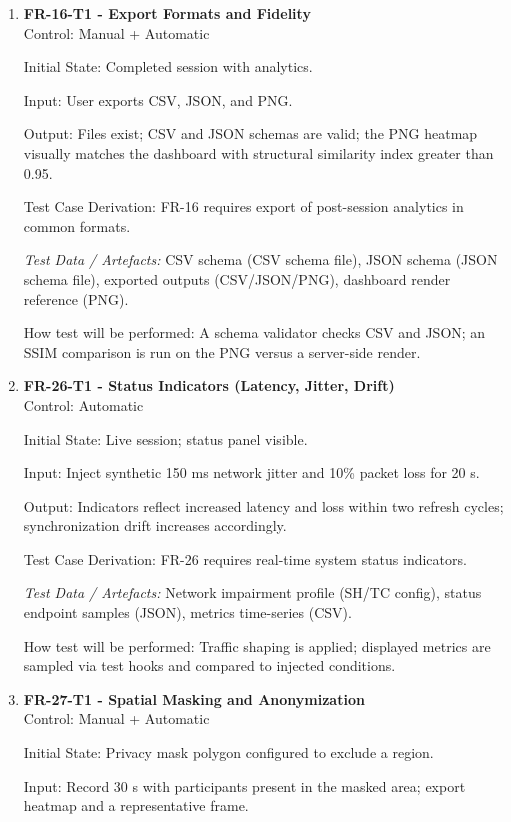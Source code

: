 \documentclass[12pt, titlepage]{article}
\begin{document}
\begin{enumerate}
\item \textbf{FR-16-T1 - Export Formats and Fidelity} \\

Control: Manual + Automatic

Initial State: Completed session with analytics.

Input: User exports CSV, JSON, and PNG.

Output: Files exist; CSV and JSON schemas are valid; the PNG heatmap visually matches the dashboard with structural similarity index greater than 0.95.

Test Case Derivation: FR-16 requires export of post-session analytics in common formats.

\textit{Test Data / Artefacts:} CSV schema (CSV schema file), JSON schema (JSON schema file), exported outputs (CSV/JSON/PNG), dashboard render reference (PNG).

How test will be performed: A schema validator checks CSV and JSON; an SSIM comparison is run on the PNG versus a server-side render.

\item \textbf{FR-26-T1 - Status Indicators (Latency, Jitter, Drift)} \\

Control: Automatic

Initial State: Live session; status panel visible.

Input: Inject synthetic 150 ms network jitter and 10\% packet loss for 20 s.

Output: Indicators reflect increased latency and loss within two refresh cycles; synchronization drift increases accordingly.

Test Case Derivation: FR-26 requires real-time system status indicators.

\textit{Test Data / Artefacts:} Network impairment profile (SH/TC config), status endpoint samples (JSON), metrics time-series (CSV).

How test will be performed: Traffic shaping is applied; displayed metrics are sampled via test hooks and compared to injected conditions.

\item \textbf{FR-27-T1 - Spatial Masking and Anonymization} \\

Control: Manual + Automatic

Initial State: Privacy mask polygon configured to exclude a region.

Input: Record 30 s with participants present in the masked area; export heatmap and a representative frame.


\end{enumerate}
\end{document}
